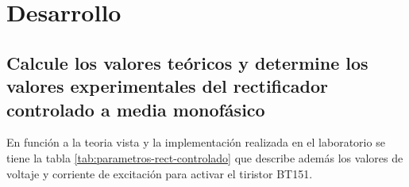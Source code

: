 \chapter{Desarrollo}

\section{Calcule los valores teóricos y determine los valores experimentales del rectificador controlado a media monofásico}

En función a la teoria vista y la implementación realizada en el laboratorio se tiene la tabla \ref{tab:parametros-rect-controlado} que describe además los valores de voltaje y corriente de excitación para activar el tiristor BT151.
